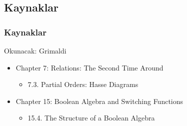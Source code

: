 \documentclass[dvipsnames]{beamer}
\theoremstyle{definition}
\theoremstyle{example}
\theoremstyle{plain}
\begin{document}
\subsection*{Kaynaklar}

\begin{frame}
  \frametitle{Kaynaklar}

  \begin{block}{Okunacak: Grimaldi}
    \begin{itemize}
      \item Chapter 7: Relations: The Second Time Around
      \begin{itemize}
        \item 7.3. \alert{Partial Orders: Hasse Diagrams}
      \end{itemize}

      \item Chapter 15: Boolean Algebra and Switching Functions
      \begin{itemize}
        \item 15.4. \alert{The Structure of a Boolean Algebra}
      \end{itemize}
    \end{itemize}
  \end{block}
\end{frame}
\end{document}
